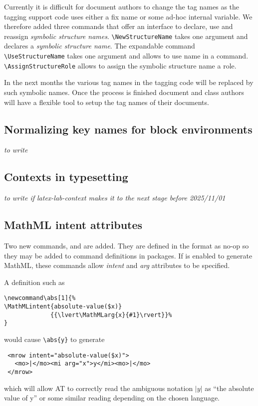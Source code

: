 \documentclass{ltnews}
\begin{document}
Currently it is difficult for document authors to change the tag names as the tagging support code uses either a fix name or some ad-hoc internal variable. We therefore added three commands that offer an interface to declare, use and reassign \emph{symbolic structure names}. \verb+\NewStructureName+ takes one argument and declares a \emph{symbolic structure name}. The expandable command \verb+\UseStructureName+ takes one argument and allows to use name in a  command. \verb+\AssignStructureRole+ allows to assign the symbolic structure name a role.

In the next months the various tag names in the tagging code will be replaced by such symbolic names. Once the process is finished document and class authors will have a flexible tool to setup the tag names of their documents. 


\subsection{Normalizing key names for block environments}

\emph{to write}


\subsection{Contexts in typesetting}

\emph{to write if latex-lab-context makes it to the next stage before 2025/11/01}


\subsection{MathML intent attributes}
Two new commands,  and  are added. They are defined
in the format as no-op so they may be added to command definitions in packages.
If  is enabled to generate MathML, these commands allow \emph{intent} and
\emph{arg} attributes to be specified.

A  definition such as
\begin{verbatim}
\newcommand\abs[1]{%
\MathMLintent{absolute-value($x)}
             {{\lvert\MathMLarg{x}{#1}\rvert}}%
}
\end{verbatim}
would cause \verb|\abs{y}| to generate
\begin{verbatim}
 <mrow intent="absolute-value($x)">
   <mo>|</mo><mi arg="x">y</mi><mo>|</mo>
 </mrow>
\end{verbatim}
which will allow AT to correctly read the ambiguous notation $|y|$
as  \enquote{the absolute value of y}
or some similar reading depending on the chosen language.
\end{document}

